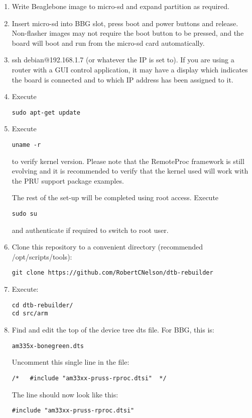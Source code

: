 \begin{enumerate}
\item  Write Beaglebone image to micro-sd and expand partition as required.
\item  Insert micro-sd into BBG slot, press boot and power buttons and release.  Non-flasher images may not require the boot button to be pressed, and the board will boot and run from the micro-sd card automatically.
\item  ssh debian@192.168.1.7 (or whatever the IP is set to).  If you are using a router with a GUI control application, it may have a display which indicates the board is connected and to which IP address has been assigned to it.
\item  Execute
\begin{verbatim}
sudo apt-get update
\end{verbatim}
\item  Execute
\begin{verbatim}
uname -r
\end{verbatim} 
to verify kernel version.  Please note that the RemoteProc framework is still evolving and it is recommended to verify that the kernel used will work with the PRU support package examples.

The rest of the set-up will be completed using root access.
Execute
\begin{verbatim}
sudo su
\end{verbatim}
and authenticate if required to switch to root user.
\item Clone this repository to a convenient directory (recommended /opt/scripts/tools):

\begin{verbatim}
git clone https://github.com/RobertCNelson/dtb-rebuilder
\end{verbatim}

\item Execute:
\begin{verbatim}
cd dtb-rebuilder/ 
cd src/arm
\end{verbatim}
\item Find and edit the top of the device tree dts file.
For BBG, this is:
\begin{verbatim}
am335x-bonegreen.dts
\end{verbatim}
Uncomment this single line in the file:
\begin{verbatim}
/*   #include "am33xx-pruss-rproc.dtsi"  */
\end{verbatim}

The line should now look like this:
\begin{verbatim}
#include "am33xx-pruss-rproc.dtsi"
\end{verbatim}


\end{enumerate}

